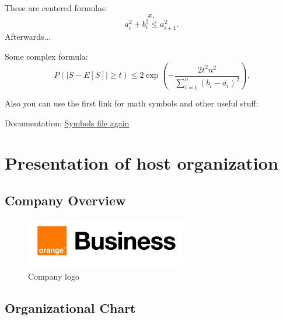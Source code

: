 These are centered formulas: $$x,$$ $$a_i^2 + b_i^2 \le a_{i+1}^2.$$ Afterwards...

Some complex formula: $$P(|S - E[S]| \ge t) \le 2 \exp \left( -\frac{2 t^2 n^2}{\sum_{i = 1}^n (b_i - a_i)^2} \right).$$

Also you can use the first link for math symbols and other useful stuff:

Documentation: \href{https://www.cmor-faculty.rice.edu/~heinken/latex/symbols.pdf}{Symbols file again}



\newpage


\section{Presentation of host organization}



\subsection{Company Overview}

\begin{figure}[H] 
    \centering
    \includegraphics[width=7cm]{Logos/ob.png}
    \caption{Company logo}
\end{figure}



\subsection{Organizational Chart}


